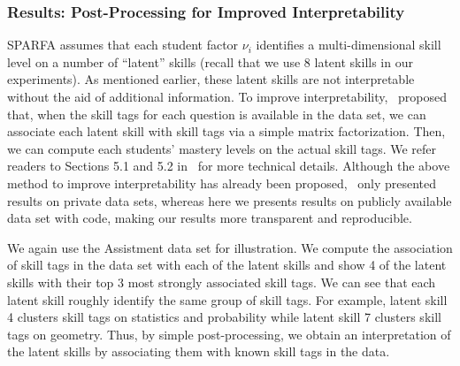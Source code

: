 \documentclass{edm_article}
\newcommand{\ml}[1]{\textcolor{orange}{\bf [LAN bandit: #1]}}
\newcommand{\jack}[1]{\textcolor{purple}{\bf [jack the ripper: #1]}}
\begin{document}
\subsubsection{Results: Post-Processing for Improved Interpretability}
\label{sec:experiment-post-processing}
SPARFA assumes that each student factor $\nu_i$ identifies a multi-dimensional skill level on a number of ``latent'' skills (recall that we use 8 latent skills in our experiments). As mentioned earlier, these latent skills are not interpretable without the aid of additional information. To improve interpretability,~\cite{lan14a} proposed that, when the skill tags for each question is available in the data set, we can associate each latent skill with skill tags via a simple matrix factorization. Then, we can compute each students' mastery levels on the actual skill tags. We refer readers to Sections 5.1 and 5.2 in~\cite{lan14a} for more technical details. 
Although the above method to improve interpretability has already been proposed,~\cite{lan14a} only presented results on private data sets, whereas here we presents results on publicly available data set with code, making our results more transparent and reproducible.

We again use the Assistment data set for illustration. We compute the association of skill tags in the data set
with each of the latent skills and show 4 of the latent skills with their top 3 most strongly associated skill tags. We can see that each latent skill roughly identify the same group of skill tags. For example, latent skill 4 clusters skill tags on statistics and probability while latent skill 7 clusters skill tags on 
geometry. Thus, by simple post-processing, we obtain an interpretation of the latent skills by associating them with known skill tags in the data.
\end{document}
